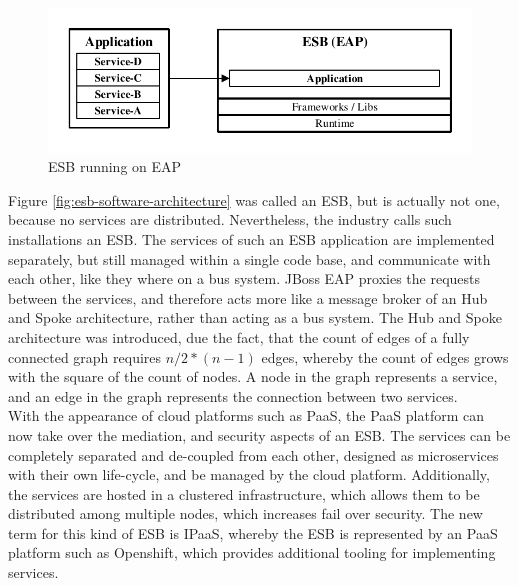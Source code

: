 \begin{figure}[htbp]
	\centering
	\includegraphics[scale=1]{images/esb-software-architecture.pdf}
	\caption{ESB running on EAP}
	\label{fig:esb-software-architecture}
\end{figure} 

Figure \vref{fig:esb-software-architecture} was called an ESB, but is actually not one, because no services are distributed. Nevertheless, the industry calls such installations an ESB. The services of such an ESB application are implemented separately, but still managed within a single code base, and communicate with each other, like they where on a bus system. JBoss EAP proxies the requests between the services, and therefore acts more like a message broker of an Hub and Spoke architecture, rather than acting as a bus system. The Hub and Spoke architecture was introduced, due the fact, that the count of edges of a fully connected graph requires $n / 2 * (n -1)$ edges, whereby the count of edges grows with the square of the count of nodes. A node in the graph represents a service, and an edge in the graph represents the connection between two services\cite{EIP,HubAndSpoke2003}. \\

With the appearance of cloud platforms such as PaaS, the PaaS platform can now take over the mediation, and security aspects of an ESB. The services can be completely separated and de-coupled from each other, designed as microservices with their own life-cycle, and be managed by the cloud platform. Additionally, the services are hosted in a clustered infrastructure, which allows them to be distributed among multiple nodes, which increases fail over security. The new term for this kind of ESB is IPaaS, whereby the ESB is represented by an PaaS platform such as Openshift, which provides additional tooling for implementing services\cite{iPaaSP12015, iPaaSP22015}.

